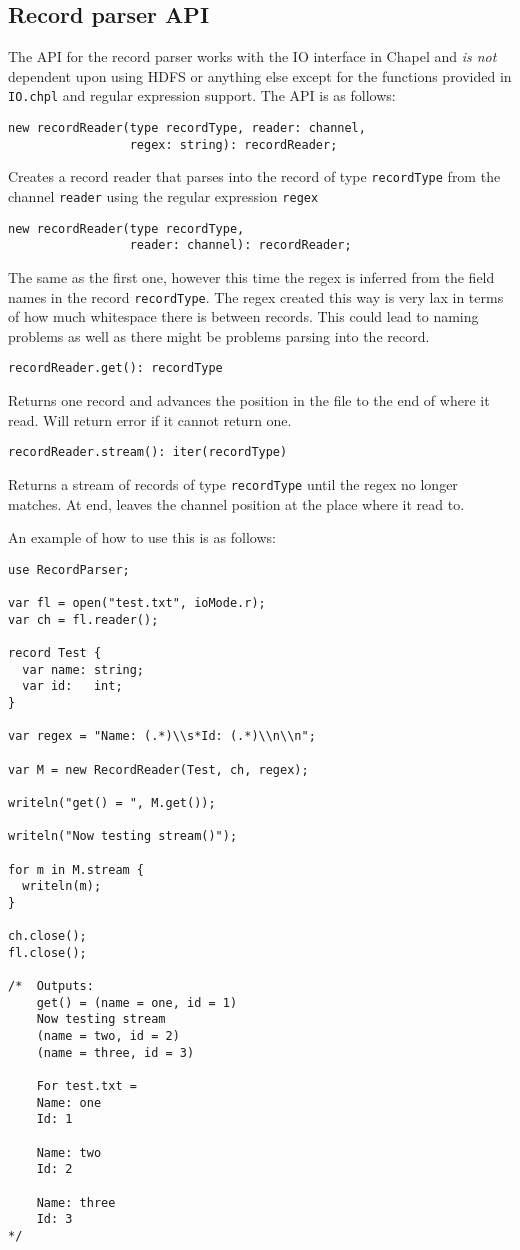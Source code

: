 \subsection{Record parser API}
The API for the record parser works with the IO interface in Chapel and
\emph{is not} dependent upon using HDFS or anything else except for the
functions provided in {\tt IO.chpl} and regular expression support. The
API is as follows:
\begin{lstlisting}
new recordReader(type recordType, reader: channel, 
                 regex: string): recordReader;
\end{lstlisting}
Creates a record reader that parses into the record of type {\tt recordType}
from the channel {\tt reader} using the regular expression {\tt regex}
\begin{lstlisting}
new recordReader(type recordType, 
                 reader: channel): recordReader;
\end{lstlisting}
The same as the first one, however this time the regex is inferred from the
field names in the record {\tt recordType}. The regex created this way is very
lax in terms of how much whitespace there is between records. This could lead to naming problems as
well as there might be problems parsing into the record. 

\begin{lstlisting}
recordReader.get(): recordType
\end{lstlisting}
Returns one record and advances the position in the file to the end of
where it read. Will return error if it cannot return one.

\begin{lstlisting}
recordReader.stream(): iter(recordType)
\end{lstlisting}
Returns a stream of records of type {\tt recordType} until the regex no longer
matches. At end, leaves the channel position at the place where it read to.  

An example of how to use this is as follows:
\begin{lstlisting}
use RecordParser;

var fl = open("test.txt", ioMode.r);
var ch = fl.reader();

record Test {
  var name: string;
  var id:   int;
}

var regex = "Name: (.*)\\s*Id: (.*)\\n\\n";

var M = new RecordReader(Test, ch, regex);

writeln("get() = ", M.get());

writeln("Now testing stream()");

for m in M.stream {
  writeln(m);
}

ch.close();
fl.close();

/*  Outputs: 
    get() = (name = one, id = 1)
    Now testing stream
    (name = two, id = 2)
    (name = three, id = 3)

    For test.txt = 
    Name: one
    Id: 1

    Name: two
    Id: 2

    Name: three
    Id: 3
*/
\end{lstlisting}

